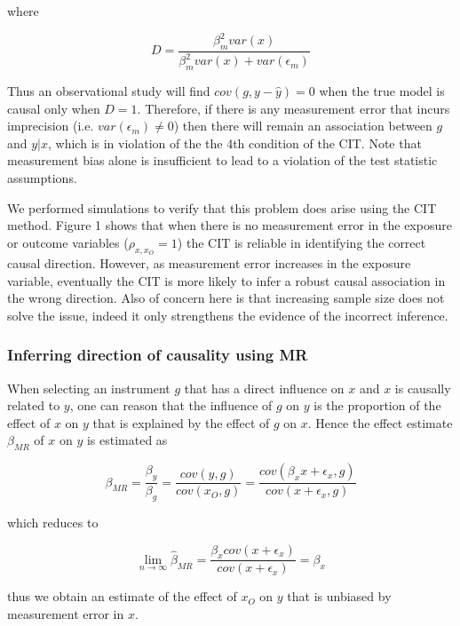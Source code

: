 \documentclass[]{article}
\begin{document}
where

\[
D = \frac{\beta^2_m var(x)} {\beta^2_m var(x) + var(\epsilon_m)}
\]

Thus an observational study will find $cov(g, y - \hat{y}) = 0$ when the
true model is causal only when $D = 1$. Therefore, if there is any
measurement error that incurs imprecision (i.e.
$var(\epsilon_m) \neq 0$) then there will remain an association between
$g$ and $y|x$, which is in violation of the the 4th condition of the
CIT. Note that measurement bias alone is insufficient to lead to a
violation of the test statistic assumptions.

We performed simulations to verify that this problem does arise using
the CIT method. Figure 1 shows that when there is no measurement error
in the exposure or outcome variables ($\rho_{x, x_O}=1$) the CIT is
reliable in identifying the correct causal direction. However, as
measurement error increases in the exposure variable, eventually the CIT
is more likely to infer a robust causal association in the wrong
direction. Also of concern here is that increasing sample size does not
solve the issue, indeed it only strengthens the evidence of the
incorrect inference.

\subsubsection{Inferring direction of causality using
MR}\label{inferring-direction-of-causality-using-mr}

When selecting an instrument $g$ that has a direct influence on $x$ and
$x$ is causally related to $y$, one can reason that the influence of $g$
on $y$ is the proportion of the effect of $x$ on $y$ that is explained
by the effect of $g$ on $x$. Hence the effect estimate $\beta_{MR}$ of
$x$ on $y$ is estimated as

\[
\beta_{MR} = \frac{\beta_y}{\beta_g} = \frac{cov(y, g)}{cov(x_O, g)} = \frac{cov(\beta_x x + \epsilon_x, g)}{cov(x + \epsilon_x, g)}
\]

which reduces to

\[
\lim_{n \to \infty} \hat{\beta}_{MR} = \frac{\beta_x cov(x + \epsilon_x)}{cov(x + \epsilon_x)} = \beta_x
\]

thus we obtain an estimate of the effect of $x_O$ on $y$ that is
unbiased by measurement error in $x$.
\end{document}
